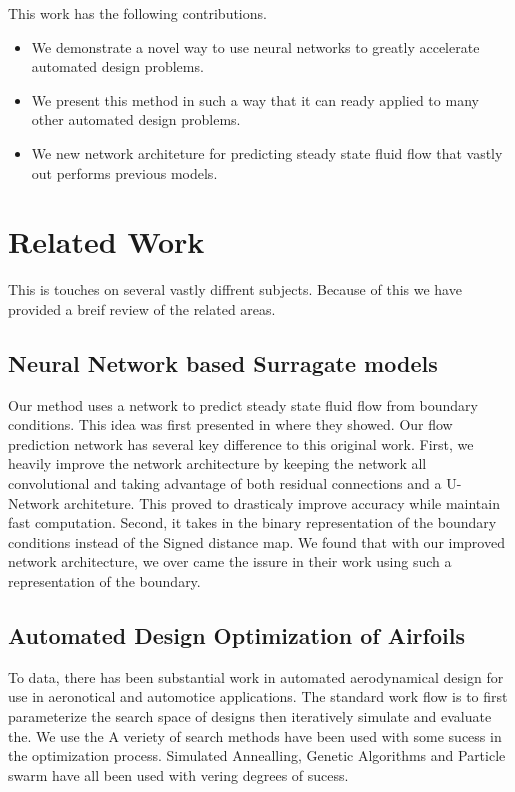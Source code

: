 \documentclass{article} %
\begin{document}
This work has the following contributions.
\begin{itemize}
  \item We demonstrate a novel way to use neural networks to greatly accelerate automated design problems.
  \item We present this method in such a way that it can ready applied to many other automated design problems.
  \item We new network architeture for predicting steady state fluid flow that vastly out performs previous models.
\end{itemize}

\section{Related Work}

This is touches on several vastly diffrent subjects. Because of this we have provided a breif review of the related areas.

\subsection{Neural Network based Surragate models}


Our method uses a network to predict steady state fluid flow from boundary conditions. This idea was first presented in \citep{guo2016convolutional} where they showed. Our flow prediction network has several key difference to this original work. First, we heavily improve the network architecture by keeping the network all convolutional and taking advantage of both residual connections and a U-Network architeture. This proved to drasticaly improve accuracy while maintain fast computation. Second, it takes in the binary representation of the boundary conditions instead of the Signed distance map. We found that with our improved network architecture, we over came the issure in their work using such a representation of the boundary.

\subsection{Automated Design Optimization of Airfoils}

To data, there has been substantial work in automated aerodynamical design for use in aeronotical and automotice applications. The standard work flow is to first parameterize the search space of designs then iteratively simulate and evaluate the. We use the A veriety of search methods have been used with some sucess in the optimization process. Simulated Annealling, Genetic Algorithms and Particle swarm have all been used with vering degrees of sucess. 
\end{document}
